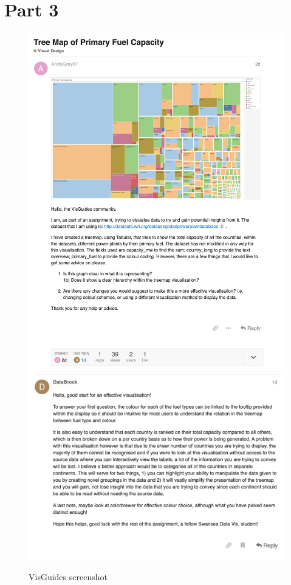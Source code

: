 \hypertarget{part-3}{%
\section{Part 3}\label{part-3}}

\begin{figure}
\centering
\includegraphics[width=15cm]{Question}
\includegraphics[width=15cm]{answer}
\caption{VisGuides screenshot}
\end{figure}
